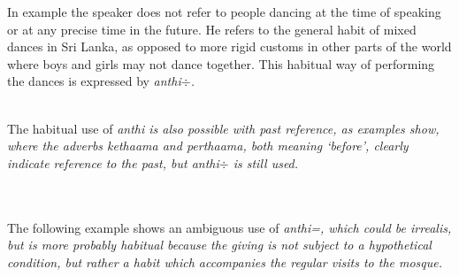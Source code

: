% 
%  

In example  the speaker does not refer to people dancing at the time of speaking or at any precise time in the future. He refers to the general habit of mixed dances in Sri Lanka, as opposed to more rigid customs in other parts of the world where boys and girls may not dance together. This habitual way of performing the dances is expressed by  \em anthi$\div$\em.

 \\
The habitual use of \em anthi \em is also possible with past reference, as examples  show, where the adverbs \em kethaama \em and \em perthaama\em, both meaning `before', clearly indicate reference to the past, but \em anthi$\div$ \em is still used.

\\


 \\

The following example shows an ambiguous use of \em anthi=\em, which could be irrealis, but is more probably habitual because the giving is not subject to a hypothetical condition, but rather a habit which accompanies the regular visits to the mosque.


